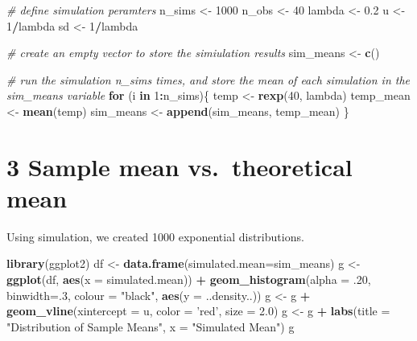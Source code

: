 \documentclass[]{article}
\newenvironment{Shaded}{\begin{snugshade}}{\end{snugshade}}
\newcommand{\CommentTok}[1]{\textcolor[rgb]{0.56,0.35,0.01}{\textit{#1}}}
\newcommand{\ControlFlowTok}[1]{\textcolor[rgb]{0.13,0.29,0.53}{\textbf{#1}}}
\newcommand{\DataTypeTok}[1]{\textcolor[rgb]{0.13,0.29,0.53}{#1}}
\newcommand{\DecValTok}[1]{\textcolor[rgb]{0.00,0.00,0.81}{#1}}
\newcommand{\FloatTok}[1]{\textcolor[rgb]{0.00,0.00,0.81}{#1}}
\newcommand{\KeywordTok}[1]{\textcolor[rgb]{0.13,0.29,0.53}{\textbf{#1}}}
\newcommand{\NormalTok}[1]{#1}
\newcommand{\OperatorTok}[1]{\textcolor[rgb]{0.81,0.36,0.00}{\textbf{#1}}}
\newcommand{\StringTok}[1]{\textcolor[rgb]{0.31,0.60,0.02}{#1}}
\begin{document}
\begin{Shaded}
\begin{Highlighting}[]
\CommentTok{# define simulation peramters}
\NormalTok{n_sims <-}\StringTok{ }\DecValTok{1000}
\NormalTok{n_obs <-}\StringTok{ }\DecValTok{40}
\NormalTok{lambda <-}\StringTok{ }\FloatTok{0.2}
\NormalTok{u <-}\StringTok{ }\DecValTok{1}\OperatorTok{/}\NormalTok{lambda}
\NormalTok{sd <-}\StringTok{ }\DecValTok{1}\OperatorTok{/}\NormalTok{lambda}

\CommentTok{# create an empty vector to store the simiulation results}
\NormalTok{sim_means <-}\StringTok{ }\KeywordTok{c}\NormalTok{()}

\CommentTok{# run the simulation n_sims times, and store the mean of each simulation in the sim_means variable}
\ControlFlowTok{for}\NormalTok{ (i }\ControlFlowTok{in} \DecValTok{1}\OperatorTok{:}\NormalTok{n_sims)\{}
\NormalTok{    temp <-}\StringTok{ }\KeywordTok{rexp}\NormalTok{(}\DecValTok{40}\NormalTok{, lambda)}
\NormalTok{    temp_mean <-}\StringTok{ }\KeywordTok{mean}\NormalTok{(temp)}
\NormalTok{    sim_means <-}\StringTok{ }\KeywordTok{append}\NormalTok{(sim_means, temp_mean)}
\NormalTok{\}}
\end{Highlighting}
\end{Shaded}

\hypertarget{sample-mean-vs.theoretical-mean}{%
\section{3 Sample mean vs.~theoretical
mean}\label{sample-mean-vs.theoretical-mean}}

Using simulation, we created 1000 exponential distributions.

\begin{Shaded}
\begin{Highlighting}[]
\KeywordTok{library}\NormalTok{(ggplot2)}
\NormalTok{df <-}\StringTok{ }\KeywordTok{data.frame}\NormalTok{(}\DataTypeTok{simulated.mean=}\NormalTok{sim_means)}
\NormalTok{g <-}\StringTok{ }\KeywordTok{ggplot}\NormalTok{(df, }\KeywordTok{aes}\NormalTok{(}\DataTypeTok{x =}\NormalTok{ simulated.mean)) }\OperatorTok{+}\StringTok{ }\KeywordTok{geom_histogram}\NormalTok{(}\DataTypeTok{alpha =} \FloatTok{.20}\NormalTok{, }\DataTypeTok{binwidth=}\NormalTok{.}\DecValTok{3}\NormalTok{, }\DataTypeTok{colour =} \StringTok{"black"}\NormalTok{, }\KeywordTok{aes}\NormalTok{(}\DataTypeTok{y =}\NormalTok{ ..density..))}
\NormalTok{g <-}\StringTok{ }\NormalTok{g }\OperatorTok{+}\StringTok{ }\KeywordTok{geom_vline}\NormalTok{(}\DataTypeTok{xintercept =}\NormalTok{ u, }\DataTypeTok{color =} \StringTok{'red'}\NormalTok{, }\DataTypeTok{size =} \FloatTok{2.0}\NormalTok{)}
\NormalTok{g <-}\StringTok{ }\NormalTok{g }\OperatorTok{+}\StringTok{ }\KeywordTok{labs}\NormalTok{(}\DataTypeTok{title =} \StringTok{"Distribution of Sample Means"}\NormalTok{, }\DataTypeTok{x =} \StringTok{"Simulated Mean"}\NormalTok{)}
\NormalTok{g}
\end{Highlighting}
\end{Shaded}
\end{document}
